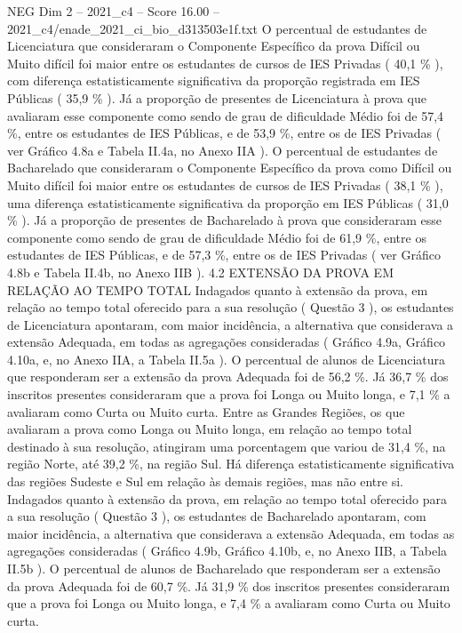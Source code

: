 \begin{textsample}{NEG Dim 2 – 2021\_c4 – Score 16.00 – 2021\_c4/enade\_2021\_ci\_bio\_d313503e1f.txt}
O percentual de estudantes de Licenciatura que consideraram o Componente Específico da prova Difícil ou Muito difícil foi maior entre os estudantes de cursos de IES Privadas ( 40,1 \% ), com diferença estatisticamente significativa da proporção registrada em IES Públicas ( 35,9 \% ).
Já a proporção de presentes de Licenciatura à prova que avaliaram esse componente como sendo de grau de dificuldade Médio foi de 57,4 \%, entre os estudantes de IES Públicas, e de 53,9 \%, entre os de IES Privadas ( ver Gráfico 4.8a e Tabela II.4a, no Anexo IIA ).
O percentual de estudantes de Bacharelado que consideraram o Componente Específico da prova como Difícil ou Muito difícil foi maior entre os estudantes de cursos de IES Privadas ( 38,1 \% ), uma diferença estatisticamente significativa da proporção em IES Públicas ( 31,0 \% ).
Já a proporção de presentes de Bacharelado à prova que consideraram esse componente como sendo de grau de dificuldade Médio foi de 61,9 \%, entre os estudantes de IES Públicas, e de 57,3 \%, entre os de IES Privadas ( ver Gráfico 4.8b e Tabela II.4b, no Anexo IIB ). 4.2 EXTENSÃO DA PROVA EM RELAÇÃO AO TEMPO TOTAL Indagados quanto à extensão da prova, em relação ao tempo total oferecido para a sua resolução ( Questão 3 ), os estudantes de Licenciatura apontaram, com maior incidência, a alternativa que considerava a extensão Adequada, em todas as agregações consideradas ( Gráfico 4.9a, Gráfico 4.10a, e, no Anexo IIA, a Tabela II.5a ).
O percentual de alunos de Licenciatura que responderam ser a extensão da prova Adequada foi de 56,2 \%.
Já 36,7 \% dos inscritos presentes consideraram que a prova foi Longa ou Muito longa, e 7,1 \% a avaliaram como Curta ou Muito curta.
Entre as Grandes Regiões, os que avaliaram a prova como Longa ou Muito longa, em relação ao tempo total destinado à sua resolução, atingiram uma porcentagem que variou de 31,4 \%, na região Norte, até 39,2 \%, na região Sul.
Há diferença estatisticamente significativa das regiões Sudeste e Sul em relação às demais regiões, mas não entre si.
Indagados quanto à extensão da prova, em relação ao tempo total oferecido para a sua resolução ( Questão 3 ), os estudantes de Bacharelado apontaram, com maior incidência, a alternativa que considerava a extensão Adequada, em todas as agregações consideradas ( Gráfico 4.9b, Gráfico 4.10b, e, no Anexo IIB, a Tabela II.5b ).
O percentual de alunos de Bacharelado que responderam ser a extensão da prova Adequada foi de 60,7 \%.
Já 31,9 \% dos inscritos presentes consideraram que a prova foi Longa ou Muito longa, e 7,4 \% a avaliaram como Curta ou Muito curta.

\end{textsample}
